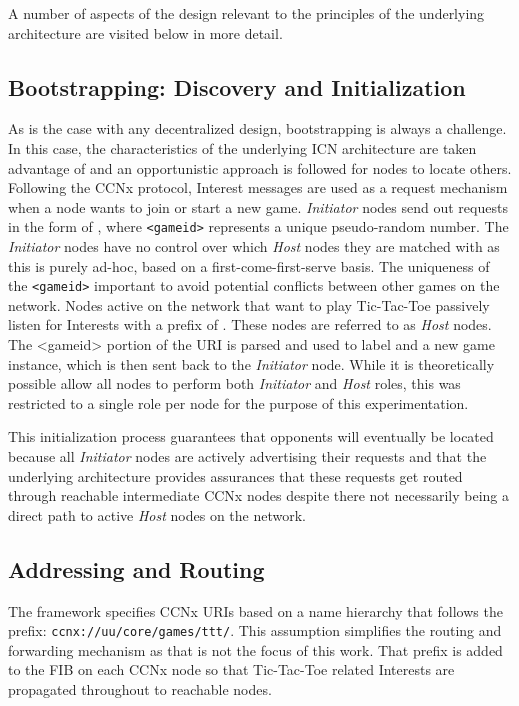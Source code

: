 \documentclass[a4paper,12pt]{report}      %
\begin{document}
A number of aspects of the design relevant to the principles of the underlying architecture are visited below in more detail.

\subsection{Bootstrapping: Discovery and Initialization}

As is the case with any decentralized design, bootstrapping is always a challenge. In this case, the
characteristics of the underlying ICN architecture are taken advantage of and an opportunistic approach
is followed for nodes to locate others. Following the CCNx protocol, Interest messages are used as a
request mechanism when a node wants to join or start a new game. \emph{Initiator} nodes send out requests in
the form of \texttt{}, where \texttt{<gameid>} represents a 
unique pseudo-random number. The \emph{Initiator} nodes have no control over which \emph{Host} nodes they are 
matched with as this is purely ad-hoc, based on a first-come-first-serve basis. The uniqueness of the \texttt{<gameid>}
 important to avoid potential conflicts between other games on the network. Nodes active on the network that want to
 play Tic-Tac-Toe passively listen for Interests with a prefix of \texttt{}. These nodes are referred to as \emph{Host} nodes. The <gameid> portion of the URI is parsed and used to label and a new game instance, which is
then sent back to the \emph{Initiator} node. While it is theoretically possible allow 
all nodes to perform both \emph{Initiator} and \emph{Host} roles, this was restricted to a single role per node for
the purpose of this experimentation.

This initialization process guarantees that opponents will eventually be located because all \emph{Initiator}
nodes are actively advertising their requests and that the underlying architecture provides assurances
that these requests get routed through reachable intermediate CCNx nodes despite there not necessarily
being a direct path to active \emph{Host} nodes on the network.

\subsection{Addressing and Routing}

The framework specifies CCNx URIs based on a name hierarchy that follows the prefix:    
\verb!ccnx://uu/core/games/ttt/!. This assumption simplifies the routing and forwarding mechanism as that is not the focus of this work. That prefix is added to the FIB on each CCNx node so that Tic-Tac-Toe related Interests are propagated throughout to reachable nodes.
\end{document}
